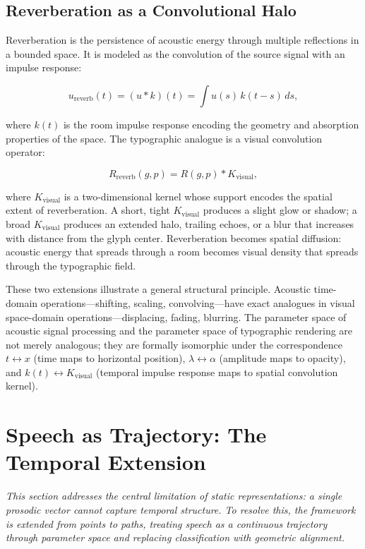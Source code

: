 \documentclass[12pt, a4paper]{article}
\begin{document}
\subsection{Reverberation as a Convolutional Halo}

Reverberation is the persistence of acoustic energy through multiple reflections in a bounded space. It is modeled as the convolution of the source signal with an impulse response:

\begin{equation}
u_{\mathrm{reverb}}(t) = (u * k)(t) = \int u(s)\, k(t - s)\, ds,
\label{eq:reverb}
\end{equation}

where $k(t)$ is the room impulse response encoding the geometry and absorption properties of the space. The typographic analogue is a visual convolution operator:

\begin{equation}
R_{\mathrm{reverb}}(g, p) = R(g, p) * K_{\mathrm{visual}},
\label{eq:Rreverb}
\end{equation}

where $K_{\mathrm{visual}}$ is a two-dimensional kernel whose support encodes the spatial extent of reverberation. A short, tight $K_{\mathrm{visual}}$ produces a slight glow or shadow; a broad $K_{\mathrm{visual}}$ produces an extended halo, trailing echoes, or a blur that increases with distance from the glyph center. Reverberation becomes spatial diffusion: acoustic energy that spreads through a room becomes visual density that spreads through the typographic field.

These two extensions illustrate a general structural principle. Acoustic time-domain operations---shifting, scaling, convolving---have exact analogues in visual space-domain operations---displacing, fading, blurring. The parameter space of acoustic signal processing and the parameter space of typographic rendering are not merely analogous; they are formally isomorphic under the correspondence $t \leftrightarrow x$ (time maps to horizontal position), $\lambda \leftrightarrow \alpha$ (amplitude maps to opacity), and $k(t) \leftrightarrow K_{\mathrm{visual}}$ (temporal impulse response maps to spatial convolution kernel).

\section{Speech as Trajectory: The Temporal Extension}

\noindent\textit{This section addresses the central limitation of static representations: a single prosodic vector cannot capture temporal structure. To resolve this, the framework is extended from points to paths, treating speech as a continuous trajectory through parameter space and replacing classification with geometric alignment.}
\end{document}
